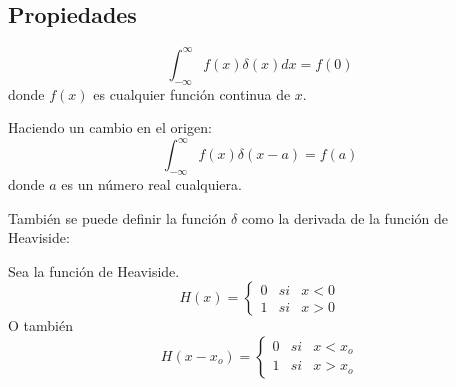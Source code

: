\documentclass[../main]{subfiles}
\begin{document}
\subsection{Propiedades}
\begin{enumerate}
    \item 
    \begin{equation}
        \int_{-\infty}^{\infty} f(x) \delta(x)dx=f(0)
    \end{equation}
    donde $f(x)$ es cualquier función continua de $x$. \\[0.5cm]
    \begin{minipage}{0.5\textwidth}
    \item 
        Haciendo un cambio en el origen:
        \begin{equation}
            \int_{-\infty}^{\infty} f(x) \delta(x-a)=f(a)
        \end{equation}
        donde $a$ es un número real cualquiera.
    \end{minipage}
    \begin{minipage}{0.5\textwidth}
        
    \end{minipage}
    \item También se puede definir la función $\delta$ como la derivada de la función de Heaviside: \\[0.5cm]
    \begin{minipage}{0.5\textwidth}
        Sea la función de Heaviside.
        \begin{equation}
        H(x)=
        \left\{ 
        \begin{array}{lll}
             0 & si & x<0 \\
             1 & si & x>0 
        \end{array} 
        \right. 
        \end{equation}
        O también
        \begin{equation}
        H(x-x_o)=
        \left\{ 
        \begin{array}{lll}
             0 & si & x<x_o \\
             1 & si & x>x_o 
        \end{array} 
        \right. 
        \end{equation}
    \end{minipage}
    \begin{minipage}{0.5\textwidth}
        

\end{minipage}
\end{enumerate}
\end{document}

